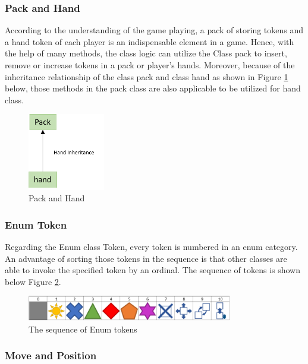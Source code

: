 \subsubsection{Pack and Hand }

According to the understanding of the game playing, a pack of storing tokens and a hand token of each player is an indispensable element in a game. Hence, with the help of many methods, the class logic can utilize the Class pack to insert, remove or increase tokens in a pack or player's hands. Moreover, because of the inheritance relationship of the class pack and class hand as shown in Figure \ref{fig:packAndHand} below, those methods in the pack class are also applicable to be utilized for hand class. 

\begin{figure}[h]
	\centering
	\includegraphics[width=0.3\textwidth]{image/diagram_5}
	\caption{Pack and Hand}
	\label{fig:packAndHand}
\end{figure}

\newpage
\subsubsection{Enum Token }

Regarding the Enum class Token, every token is numbered in an enum category. An advantage of sorting those tokens in the sequence is that other classes are able to invoke the specified token by an ordinal. The sequence of tokens is shown below Figure \ref{fig:enumToken}.

	\begin{figure}[h]
	  \centering
	  \includegraphics[width=0.8\textwidth]{image/sequenceOfEnumTokens}
      \caption{The sequence of Enum tokens}
	  \label{fig:enumToken}
    \end{figure}

\subsubsection{Move and Position}

